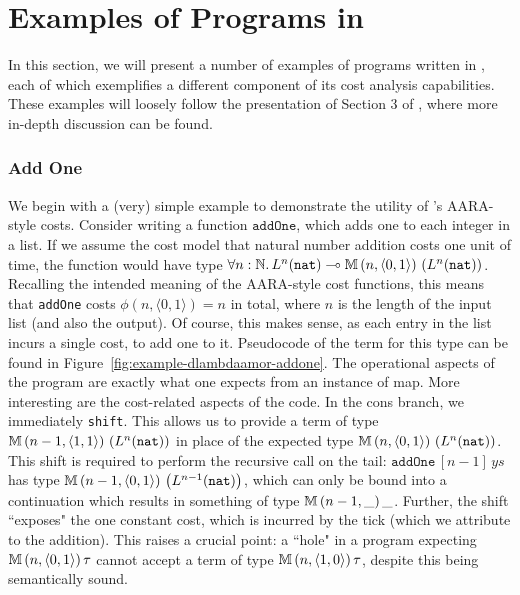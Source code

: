 \section{Examples of Programs in \dlambdaamor}
\label{sec:dlambdaamor-examples}
In this section, we will present a number of examples of programs written in \dlambdaamor, each of which exemplifies a different component of its cost analysis capabilities. These examples will loosely follow the presentation of Section 3 of \citet{rajani-et-al:popl21}, where more in-depth discussion can be found.

\subsubsection{Add One}
We begin with a (very) simple example to demonstrate the utility of \dlambdaamor's AARA-style costs. Consider writing a function $\texttt{addOne}$, which adds one to each integer in a list. If we assume the cost model that natural number addition costs one unit of time, the function would have type $\forall n : \mathbb{N}. \, L^n(\texttt{nat}) \multimap \mathbb{M} \, (n,\langle 0,1 \rangle) \, \left(L^n(\texttt{nat})\right)$. Recalling the intended meaning of the AARA-style cost functions, this means that \texttt{addOne} costs $\phi(n,\langle 0,1 \rangle) = n$ in total, where $n$ is the length of the input list (and also the output). Of course, this makes sense, as each entry in the list incurs a single cost, to add one to it. Pseudocode of the term for this type can be found in Figure~\ref{fig:example-dlambdaamor-addone}. The operational aspects of the program are exactly what one expects from an instance of map. More interesting are the cost-related aspects of the code. In the cons branch, we immediately \texttt{shift}. This allows us to provide a term of type  $\mathbb{M} \, (n-1,\langle 1,1 \rangle) \, \left(L^n(\texttt{nat})\right)$ in place of the expected type $\mathbb{M} \, (n,\langle 0,1 \rangle) \, \left(L^n(\texttt{nat})\right)$. This shift is required to perform the recursive call on the tail: $\texttt{addOne} \, [n-1] \, ys$ has type $\mathbb{M} \, (n-1,\langle 0,1 \rangle) \, \left(L^{n-1} (\texttt{nat})\right)$, which can only be bound into a continuation which results in something of type $\mathbb{M} \, (n-1, \_) \, \_$. Further, the shift ``exposes" the one constant cost, which is incurred by the tick (which we attribute to the addition). This raises a crucial point: a ``hole" in a program expecting $\mathbb{M} \, (n,\langle 0,1 \rangle) \, \tau$ cannot accept a term of type $\mathbb{M} \, (n, \langle 1,0 \rangle) \, \tau$, despite this being semantically sound.

